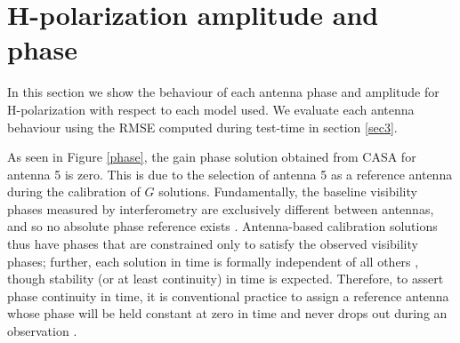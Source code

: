 \section{H-polarization amplitude and phase}
\label{Hp}
In this section we show the behaviour of each antenna phase and amplitude for H-polarization  with respect to each model used. We evaluate each antenna behaviour using the RMSE computed during test-time in section \ref{sec3}.   

As seen in Figure \ref{phase}, the gain phase solution obtained from CASA for antenna 5 is zero. This is due to the selection of antenna 5 as a reference antenna during the calibration of $G$ solutions. Fundamentally, the baseline visibility phases measured by interferometry are exclusively different between antennas, and so no absolute phase reference exists \citep{taylor1999synthesis}. Antenna-based calibration solutions thus have phases that are constrained only to satisfy the observed visibility phases; further, each solution in time is formally independent of all others \citep{taylor1999synthesis}, though stability (or at least continuity) in time is expected. Therefore, to assert phase continuity in time, it is conventional practice to assign a reference antenna whose phase will be held constant at zero in time and never drops out during an observation \citep{editioncasa}. 

